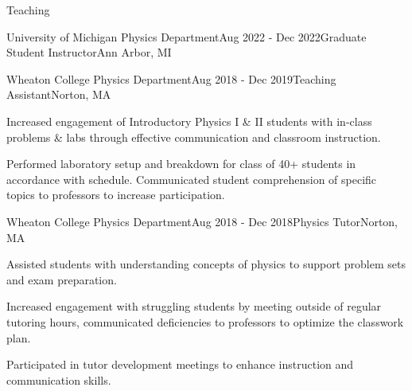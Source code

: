 \documentclass{resume} %
\begin{document}
\begin{rSection}{Teaching}
\begin{rSubsection}{University of Michigan Physics Department}{Aug 2022 - Dec 2022}{Graduate Student Instructor}{Ann Arbor, MI}
\end{rSubsection}
\begin{rSubsection}{Wheaton College Physics Department}{Aug 2018 - Dec 2019}{Teaching Assistant}{Norton, MA}
    \item Increased engagement of Introductory Physics I \& II students with in-class problems \& labs through effective communication and classroom instruction.
    \item Performed laboratory setup and breakdown for class of 40+ students in accordance with schedule. Communicated student comprehension of specific topics to professors to increase participation.
\end{rSubsection}

\begin{rSubsection}{Wheaton College Physics Department}{Aug 2018 - Dec 2018}{Physics Tutor}{Norton, MA}
    \item Assisted students with understanding concepts of physics to support problem sets and exam preparation.
    \item Increased engagement with struggling students by meeting outside of regular tutoring hours, communicated deficiencies to professors to optimize the classwork plan.
    \item Participated in tutor development meetings to enhance instruction and communication skills.

\end{rSubsection}

\end{rSection}
\end{document}
